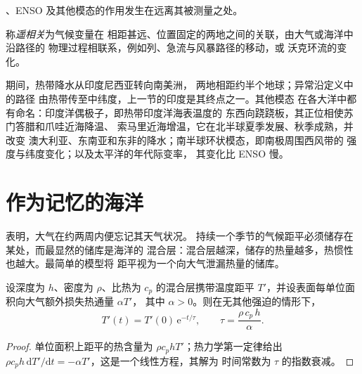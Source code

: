 、ENSO 及其他模态的作用发生在远离其被测量之处。

\begin{definition}[遥相关]\label{def:b2:climate-variability:teleconnection}
称\emph{遥相关}为气候变量在
相距甚远、位置固定的两地之间的关联，由大气或海洋中沿路径的
物理过程相联系，例如列、急流与风暴路径的移动，或
沃克环流的变化。
\end{definition}

期间，热带降水从印度尼西亚转向南美洲，
两地相距约半个地球；异常沿定义中的路径
由热带传至中纬度，上一节的印度是其终点之一。其他模态
在各大洋中都有命名：印度洋偶极子，即热带印度洋海表温度的
东西向跷跷板，其正位相使苏门答腊和爪哇近海降温、
索马里近海增温，它在北半球夏季发展、秋季成熟，并改变
澳大利亚、东南亚和东非的降水；南半球环状模态，即南极周围西风带的
强度与纬度变化；以及太平洋的年代际变率，
其变化比 ENSO 慢。

\section{作为记忆的海洋}\label{sec:b2:climate-variability:memory}

表明，大气在约两周内便忘记其天气状况。
持续一个季节的气候距平必须储存在某处，而最显然的储库是海洋的
混合层：混合层越深，储存的热量越多，热惯性也越大。最简单的模型将
距平视为一个向大气泄漏热量的储库。

\begin{proposition}[混合层距平的阻尼时间]\label{prop:b2:climate-variability:damping}
设深度为 $h$、密度为 $\rho$、比热为 $c_p$ 的混合层携带温度距平
$T'$，并设表面每单位面积向大气额外损失热通量 $\alpha T'$，
其中 $\alpha > 0$。则在无其他强迫的情形下，
\[
  T'(t) = T'(0)\,\mathrm{e}^{-t/\tau}, \qquad \tau = \frac{\rho\,c_p\,h}{\alpha} .
\]
\end{proposition}

\begin{proof}
单位面积上距平的热含量为 $\rho c_p h T'$；热力学第一定律给出 $\rho c_p h
\,\mathrm{d}T'/\mathrm{d}t = -\alpha T'$，这是一个线性方程，其解为
时间常数为 $\tau$ 的指数衰减。
\end{proof}

